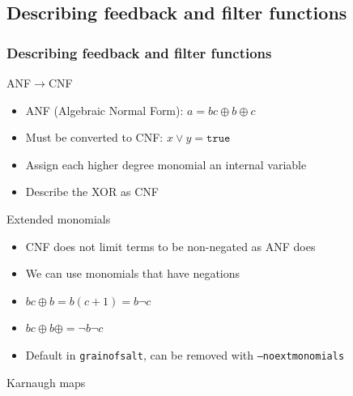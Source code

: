 \documentclass[xcolor=usenames,xcolor=svgnames,table,slidestop,compress,mathserif]{beamer}
\begin{document}
\subsection{Describing feedback and filter functions}
\frame
{\frametitle{Describing feedback and filter functions}
\begin{beamerboxesrounded}[shadow=true]{ANF$\rightarrow$CNF}
\begin{itemize}
 \item ANF (Algebraic Normal Form): $a = bc \oplus b \oplus c$
 \item Must be converted to CNF: $x \vee y = \texttt{true}$
 \item Assign each higher degree monomial an internal variable
 \item Describe the XOR as CNF
\end{itemize}
\end{beamerboxesrounded}

\begin{beamerboxesrounded}[shadow=true]{Extended monomials}
\begin{itemize}
 \item CNF does not limit terms to be non-negated as ANF does
 \item We can use monomials that have negations
 \item $bc\oplus b = b(c+1) = b\neg c$
 \item $bc\oplus b \oplus = \neg b \neg c$
 \item Default in \texttt{grainofsalt}, can be removed with \texttt{--noextmonomials}
\end{itemize}
\end{beamerboxesrounded}

\begin{beamerboxesrounded}[shadow=true]{Karnaugh maps}
\end{beamerboxesrounded}

}
\end{document}
